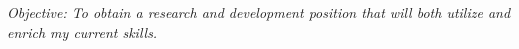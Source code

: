 \documentclass{res}
\begin{document}
 
\thispagestyle{empty} %
\address{\small
Oak Ridge National Laboratory, Virginia Tech \\
\hspace{.2in}\emph{simh@onrl.gov}, \emph{(540) 391-0202}
}

\begin{resume}
{\small \it Objective: To obtain a research and development position 
that will both utilize and enrich my current skills.}


 
 
 







 
\end{resume}
\end{document}
